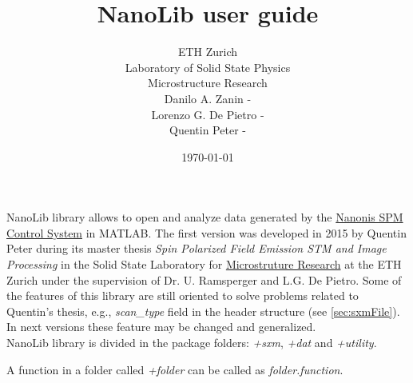 

\usepackage{amsmath}
\renewcommand{\familydefault}{\sfdefault}
\setlength\parindent{0pt}


\newcommand{\+}[1]{\item \textbf{#1}}
\newcommand{\nanonis}{\href{http://www.specs-zurich.com/en/home.html;jsessionid=FCD8A587EE447665C3F4A8CC374671EE}{Nanonis SPM Control System\texttrademark}}
\newcommand{\matlab}{MATLAB\texttrademark}

\title{NanoLib user guide}
\author{
ETH Zurich\\
Laboratory of Solid State Physics\\\vspace{.5em}
Microstructure Research\\ 
{\small Danilo A. Zanin - }\\
{\small Lorenzo G. De Pietro - }\\
{\small Quentin Peter - }
}

\date{\today}


\maketitle
NanoLib library allows to open and analyze data generated by the \nanonis{} in \matlab.
The first version was developed in 2015 by Quentin Peter during its master thesis \emph{Spin Polarized Field Emission STM and Image Processing} in the Solid State Laboratory for \href{http://www.microstructure.ethz.ch}{Microstruture Research} at the ETH Zurich under the supervision of Dr. U. Ramsperger and L.G. De Pietro.
Some of the features of this library are still oriented to solve problems related to Quentin's thesis, e.g., \emph{scan\_type} field in the header structure (see \ref{sec:sxmFile}). 
In next versions these feature may be changed and generalized.\\

NanoLib library is divided in the package folders: \emph{+sxm}, \emph{+dat} and \emph{+utility}.

A function in a folder called \emph{+folder} can be called as \emph{folder.function}.\\

